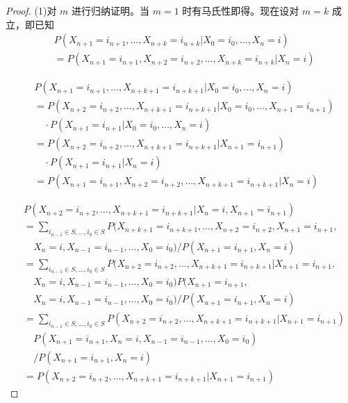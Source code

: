 \documentclass[lang=cn,10pt,thmcnt=section]{elegantbook}
\begin{document}
\begin{proof}
	(1)对 \(m\) 进行归纳证明。当 \(m = 1\) 时有马氏性即得。现在设对 \(m = k\) 成立，即已知
	\[
	\begin{aligned}
	& P(X_{n+1} = i_{n+1}, \ldots, X_{n+k} = i_{n+k} | X_0 = i_0, \ldots, X_n = i) \\
	& = P(X_{n+1} = i_{n+1}, X_{n+2} = i_{n+2}, \ldots, X_{n+k} = i_{n+k} | X_n = i)
	\end{aligned}
	\]
	
	\[
	\begin{aligned}
	& P(X_{n+1} = i_{n+1}, \ldots, X_{n+k+1} = i_{n+k+1} | X_0 = i_0, \ldots, X_n = i) \\
	& = P(X_{n+2} = i_{n+2}, \ldots, X_{n+k+1} = i_{n+k+1} | X_0 = i_0, \ldots, X_{n+1} = i_{n+1}) \\
	& \quad \cdot P(X_{n+1} = i_{n+1} | X_0 = i_0, \ldots, X_n = i) \\
	& = P(X_{n+2} = i_{n+2}, \ldots, X_{n+k+1} = i_{n+k+1} | X_{n+1} = i_{n+1}) \\
	& \quad \cdot P(X_{n+1} = i_{n+1} | X_n = i) \\
	& = P(X_{n+1} = i_{n+1}, X_{n+2} = i_{n+2}, \ldots, X_{n+k+1} = i_{n+k+1} | X_n = i)
	\end{aligned}
	\]
	
	\[
	\begin{aligned}
	& P(X_{n+2} = i_{n+2}, \ldots, X_{n+k+1} = i_{n+k+1} | X_n = i, X_{n+1} = i_{n+1}) \\
	& = \sum_{i_{n-1} \in S, \ldots, i_0 \in S} P(X_{n+k+1} = i_{n+k+1}, \ldots, X_{n+2} = i_{n+2}, X_{n+1} = i_{n+1}, \\
	& \quad X_n = i, X_{n-1} = i_{n-1}, \ldots, X_0 = i_0) / P(X_{n+1} = i_{n+1}, X_n = i) \\
	& = \sum_{i_{n-1} \in S, \ldots, i_0 \in S} P(X_{n+2} = i_{n+2}, \ldots, X_{n+k+1} = i_{n+k+1} | X_{n+1} = i_{n+1}, \\
	& \quad X_n = i, X_{n-1} = i_{n-1}, \ldots, X_0 = i_0) P(X_{n+1} = i_{n+1}, \\
	& \quad X_n = i, X_{n-1} = i_{n-1}, \ldots, X_0 = i_0) / P(X_{n+1} = i_{n+1}, X_n = i) \\
	& = \sum_{i_{n-1} \in S, \ldots, i_0 \in S} P(X_{n+2} = i_{n+2}, \ldots, X_{n+k+1} = i_{n+k+1} | X_{n+1} = i_{n+1}) \\
	& \quad P(X_{n+1} = i_{n+1}, X_n = i, X_{n-1} = i_{n-1}, \ldots, X_0 = i_0) \\
	& \quad / P(X_{n+1} = i_{n+1}, X_n = i) \\
	& = P(X_{n+2} = i_{n+2}, \ldots, X_{n+k+1} = i_{n+k+1} | X_{n+1} = i_{n+1})
	\end{aligned}
	\]


\end{proof}
\end{document}
